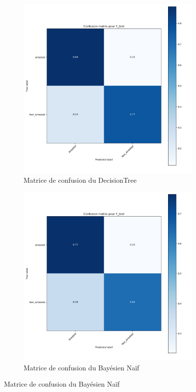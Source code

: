 \documentclass{article}
\begin{document}
    \begin{figure}[H]
	    \begin{subfigure}{.45\textwidth}
		    \includegraphics[scale=.314]{images/MatriceConfusionDecisionTree.png}
		    \centering
		    \caption{Matrice de confusion du DecisionTree}
	    \end{subfigure}
	    \begin{subfigure}{.45\textwidth}
		    \centering
		    \includegraphics[scale=.35]{images/MatriceConfusionGauss.png}
		    \caption{Matrice de confusion du Bayésien Naïf}
	    \end{subfigure}
    \end{figure}
\end{document}
